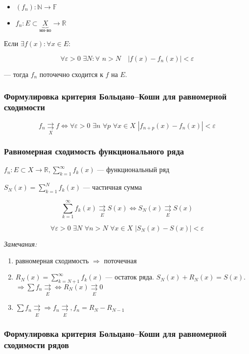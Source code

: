 \documentclass{article}
\def\dbl{\,\,}
\def\rsh#1{\underset{#1}{\rightrightarrows}}
\def\rshe{\rsh{E}}
\begin{document}
\begin{itemize}
    \item $(f_n): \mathbb{N} \rightarrow \mathbb{F}$
    \item $f_n: E \subset \underbrace{X}_{\text{мн-во}} \rightarrow \mathbb{R}$
\end{itemize}

Если $\exists f(x): \forall x \in E$:

\[\forall \varepsilon > 0 \dbl \exists N: \forall \dbl n > N \quad |f(x) - f_n(x)| < \varepsilon\]

--- тогда $f_n$ поточечно сходится к $f$ на $E$.

\subsubsection{Формулировка критерия Больцано--Коши для равномерной сходимости}

\[f_n \rsh{X} f \Leftrightarrow \forall \varepsilon > 0 \dbl \exists n \dbl \forall p \dbl \forall x \in X \dbl \left|f_{n + p}(x) - f_n(x)\right| < \varepsilon \]

\subsubsection{Равномерная сходимость функционального ряда}

$f_n: E \subset X \rightarrow \mathbb{R}, \sum_{k = 1}^{\infty} f_k(x)$ --- функциональный ряд

$S_N(x) = \sum_{k = 1}^N f_k(x)$ --- частичная сумма

\[\sum_{k = 1}^{\infty} f_k(x) \rsh{E} S(x) \Leftrightarrow S_N(x) \rshe S(x)\]

\[\forall \varepsilon > 0 \dbl \exists N \dbl \forall n > N \dbl \forall x \in X \dbl \left|S_N(x) - S(x)\right| < \varepsilon\]

\textit{Замечания:}

\begin{enumerate}
    \item равномерная сходимость $\Rightarrow$ поточечная
    \item $R_N(x) = \sum_{k = N + 1}^{\infty} f_k(x)$ --- остаток ряда. $S_N(x) + R_N(x) = S(x)$. $\Rightarrow \sum f_n \rshe \Leftrightarrow R_N(x) \rshe 0$
    \item $\sum f_n \rshe \Rightarrow f_n \rshe, f_n = R_{N} - R_{N - 1}$
\end{enumerate}

\subsubsection{Формулировка критерия Больцано--Коши для равномерной сходимости рядов}
\end{document}
